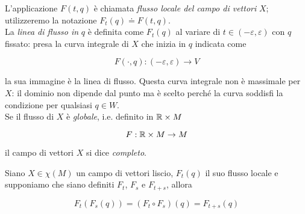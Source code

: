 L'applicazione $ F(t,q) $ è chiamata \textit{flusso locale del campo di vettori} $ X $; utilizzeremo la notazione $ F_{t}(q) \doteq F(t,q) $. \\
La \textit{linea di flusso in} $ q $ è definita come $ F_{t}(q) $ al variare di $ t \in (-\varepsilon,\varepsilon) $ con $ q $ fissato: presa la curva integrale di $ X $ che inizia in $ q $ indicata come

\begin{equation}
	F(\cdot,q) : (-\varepsilon,\varepsilon) \to V
\end{equation}

la sua immagine è la linea di flusso. Questa curva integrale non è massimale per $ X $: il dominio non dipende dal punto ma è scelto perché la curva soddisfi la condizione per qualsiasi $ q \in W $. \\
Se il flusso di $ X $ è \textit{globale}, i.e. definito in $ \mathbb{R} \times M $

\begin{equation}
	F : \mathbb{R} \times M \to M
\end{equation}

il campo di vettori $ X $ si dice \textit{completo}.

\begin{definition}
	Siano $ X \in \chi(M) $ un campo di vettori liscio, $ F_{t}(q) $ il suo flusso locale e supponiamo che siano definiti $ F_{t} $, $ F_{s} $ e $ F_{t+s} $, allora
	
	\begin{equation}
		F_{t}(F_{s}(q)) = (F_{t} \circ F_{s})(q) = F_{t+s}(q)
	\end{equation}
\end{definition}

